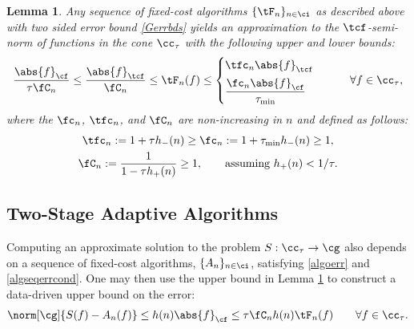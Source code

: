\documentclass[]{elsarticle}
\newtheorem{lem}{Lemma}
\theoremstyle{definition}
\theoremstyle{remark}
\newcommand{\Fnorm}[1]{\abs{#1}_{\cf}}
\newcommand{\Ftnorm}[1]{\abs{#1}_{\tcf}}
\begin{document}
\begin{lem} \label{Gnormlem} Any sequence of fixed-cost algorithms  $\{\tF_n\}_{n \in \ci}$ as described above with two sided error bound \eqref{Gerrbds} yields an approximation to the $\tcf$-semi-norm of functions in the cone $\cc_{\tau}$ with the following upper and lower bounds:
\begin{equation} \label{twosidedGineq}
 \frac{\Fnorm{f}}{\tau \fC_n}  \le \frac{\Ftnorm{f}}{\fC_n}  \le \tF_n(f) \le  \begin{cases} \tfc_n \Ftnorm{f} \\[1ex]
\displaystyle \frac{\fc_n \Fnorm{f} }{\tau_{\min}}
\end{cases} \qquad \forall f \in \cc_{\tau},
\end{equation}
where the $\fc_n$, $\tfc_n$, and $\fC_n$ are non-increasing in $n$ and defined as follows:
\begin{gather} \label{normdeflate}
\tfc_n :=1 + \tau h_{ -}(n)  \ge \fc_n :=1 + \tau_{\min} h_{ -}(n)  \ge 1, \\
\label{norminflate}
\fC_n :=\frac{1}{1 - \tau h_{ +}(n)} \ge 1, \qquad \text{assuming } h_{ +}(n) < 1/\tau.
\end{gather}
\end{lem}

\subsection{Two-Stage Adaptive Algorithms} \label{twostagesec}

Computing an approximate solution to the problem $S: \cc_{\tau} \to \cg$ also depends on a sequence of fixed-cost algorithms, $\{A_n\}_{n \in \ci}$, satisfying \eqref{algoerr} and \eqref{algseqerrcond}.  One may then use the upper bound in Lemma \ref{Gnormlem} to construct a data-driven upper bound on the error:
\begin{equation} \label{Anerrbound}
\norm[\cg]{S(f) -  A_n(f)} \le h(n)\Fnorm{f} \le \tau  \fC_n h(n)\tF_n(f) \qquad \forall f \in \cc_{\tau}.
\end{equation}
\end{document}
